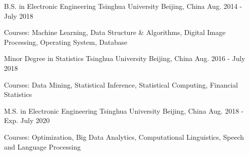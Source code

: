 

\begin{cventries}

  \cventry
    {B.S. in Electronic Engineering} %
    {Tsinghua University} %
    {Beijing, China} %
    {Aug. 2014 - July 2018} %
    {
      \begin{cvitems} %
        \item {Courses: Machine Learning, Data Structure \& Algorithms, 
        Digital Image Processing, Operating System, Database}
      \end{cvitems}
    }

  \cventry
    {Minor Degree in Statistics} %
    {Tsinghua University} %
    {Beijing, China} %
    {Aug. 2016 - July 2018} %
    {
      \begin{cvitems} %
        \item {Courses: Data Mining, Statistical Inference, Statistical Computing, Financial Statistics}
      \end{cvitems}
    }
  
  \cventry
    {M.S. in Electronic Engineering} %
    {Tsinghua University} %
    {Beijing, China} %
    {Aug. 2018 - Exp. July 2020} %
    {
      \begin{cvitems} %
        \item {Courses: Optimization, Big Data Analytics, Computational Linguistics, Speech and Language Processing}
      \end{cvitems}
    }


\end{cventries}
